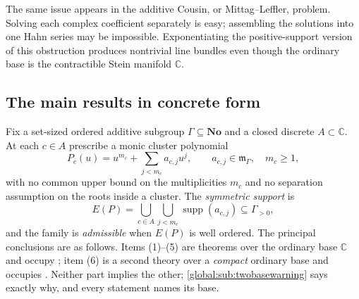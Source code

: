 \documentclass[11pt,letterpaper]{article}
\theoremstyle{definition}
\theoremstyle{remark}
\newcommand{\No}{\mathbf{No}}
\newcommand{\C}{\mathbb C}
\newcommand{\mK}{\mathfrak m_\Gamma}
\newcommand{\supp}{\operatorname{supp}}
\numberwithin{equation}{section}
\begin{document}
The same issue appears in the additive Cousin, or Mittag--Leffler, problem. Solving each complex coefficient separately is easy; assembling the solutions into one Hahn series may be impossible. Exponentiating the positive-support version of this obstruction produces nontrivial line bundles even though the ordinary base is the contractible Stein manifold $\C$.

\subsection{The main results in concrete form}\label{global:sub:mainresults}

Fix a set-sized ordered additive subgroup $\Gamma\subseteq\No$ and a closed discrete $A\subset\C$. At each $c\in A$ prescribe a monic cluster polynomial
\begin{equation}\label{global:eq:clusterintro}
  P_c(u)=u^{m_c}+\sum_{j<m_c}a_{c,j}u^j,
  \qquad a_{c,j}\in\mK,\quad m_c\ge1,
\end{equation}
with no common upper bound on the multiplicities $m_c$ and no separation assumption on the roots inside a cluster. The \emph{symmetric support} is
\begin{equation}\label{global:eq:symmsupportintro}
  E(P)=\bigcup_{c\in A}\bigcup_{j<m_c}\supp(a_{c,j})\subseteq\Gamma_{>0},
\end{equation}
and the family is \emph{admissible} when $E(P)$ is well ordered. The principal conclusions are as follows. Items \textup{(1)--(5)} are theorems over the ordinary base $\C$ and occupy ; item \textup{(6)} is a second theory over a \emph{compact} ordinary base and occupies . Neither part implies the other; \cref{global:sub:twobasewarning} says exactly why, and every statement names its base.
\end{document}
